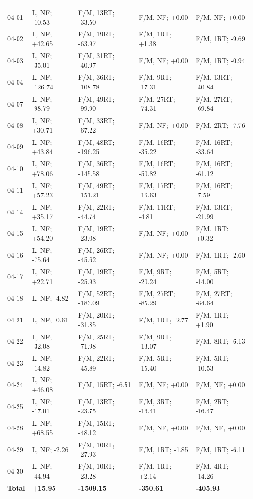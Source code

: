 \begin{table}[H]
\begin{tabular*}{\textwidth}{@{\extracolsep{\fill}} lllll}
\addlinespace[0.25em]
\midrule
\multicolumn{5}{@{}l}{\textbf{April 2025}}\\
04-01 & L, NF; -10.53 & F/M, 13RT; -33.50 & F/M, NF; +0.00 & F/M, NF; +0.00 \\
04-02 & L, NF; +42.65 & F/M, 19RT; -63.97 & F/M, 1RT; +1.38 & F/M, 1RT; -9.69 \\
04-03 & L, NF; -35.01 & F/M, 31RT; -40.97 & F/M, NF; +0.00 & F/M, 1RT; -0.94 \\
04-04 & L, NF; -126.74 & F/M, 36RT; -108.78 & F/M, 9RT; -17.31 & F/M, 13RT; -40.84 \\
04-07 & L, NF; -98.79 & F/M, 49RT; -99.90 & F/M, 27RT; -74.31 & F/M, 27RT; -69.84 \\
04-08 & L, NF; +30.71 & F/M, 33RT; -67.22 & F/M, NF; +0.00 & F/M, 2RT; -7.76 \\
04-09 & L, NF; +43.84 & F/M, 48RT; -196.25 & F/M, 16RT; -35.22 & F/M, 16RT; -33.64 \\
04-10 & L, NF; +78.06 & F/M, 36RT; -145.58 & F/M, 16RT; -50.82 & F/M, 16RT; -61.12 \\
04-11 & L, NF; +57.23 & F/M, 49RT; -151.21 & F/M, 17RT; -16.63 & F/M, 16RT; -7.59 \\
04-14 & L, NF; +35.17 & F/M, 22RT; -44.74 & F/M, 11RT; -4.81 & F/M, 13RT; -21.99 \\
04-15 & L, NF; +54.20 & F/M, 19RT; -23.08 & F/M, NF; +0.00 & F/M, 1RT; +0.32 \\
04-16 & L, NF; -75.64 & F/M, 26RT; -45.62 & F/M, NF; +0.00 & F/M, 1RT; -2.60 \\
04-17 & L, NF; +22.71 & F/M, 19RT; -25.93 & F/M, 9RT; -20.24 & F/M, 5RT; -14.00 \\
04-18 & L, NF; -4.82 & F/M, 52RT; -183.09 & F/M, 27RT; -85.29 & F/M, 27RT; -84.64 \\
04-21 & L, NF; -0.61 & F/M, 20RT; -31.85 & F/M, 1RT; -2.77 & F/M, 1RT; +1.90 \\
04-22 & L, NF; -32.08 & F/M, 25RT; -71.98 & F/M, 9RT; -13.07 & F/M, 8RT; -6.13 \\
04-23 & L, NF; -14.82 & F/M, 22RT; -45.89 & F/M, 5RT; -15.40 & F/M, 5RT; -10.53 \\
04-24 & L, NF; +46.08 & F/M, 15RT; -6.51 & F/M, NF; +0.00 & F/M, NF; +0.00 \\
04-25 & L, NF; -17.01 & F/M, 13RT; -23.75 & F/M, 3RT; -16.41 & F/M, 2RT; -16.47 \\
04-28 & L, NF; +68.55 & F/M, 15RT; -48.12 & F/M, NF; +0.00 & F/M, NF; +0.00 \\
04-29 & L, NF; -2.26 & F/M, 10RT; -27.93 & F/M, 1RT; -1.85 & F/M, 1RT; -6.11 \\
04-30 & L, NF; -44.94 & F/M, 10RT; -23.28 & F/M, 1RT; +2.14 & F/M, 4RT; -14.26 \\
\textbf{Total} & \textbf{+15.95} & \textbf{-1509.15} & \textbf{-350.61} & \textbf{-405.93} \\


\end{tabular*}
\end{table}
